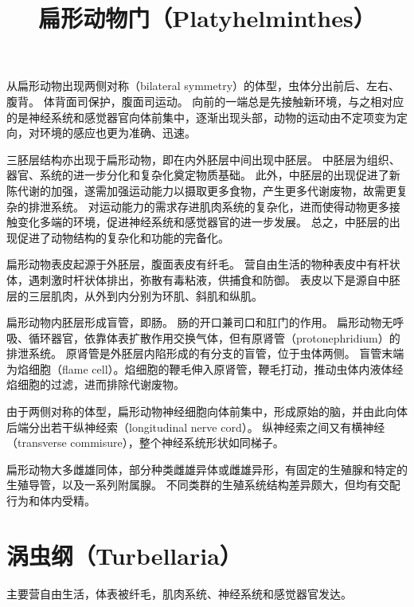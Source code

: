 \documentclass[11pt]{article}
\title{扁形动物门（Platyhelminthes）}
\date{}
\begin{document}
  \maketitle

  \linenumbers
从扁形动物出现两侧对称（bilateral symmetry）的体型，虫体分出前后、左右、腹背。
体背面司保护，腹面司运动。
向前的一端总是先接触新环境，与之相对应的是神经系统和感觉器官向体前集中，逐渐出现头部，动物的运动由不定项变为定向，对环境的感应也更为准确、迅速。

\newline

三胚层结构亦出现于扁形动物，即在内外胚层中间出现中胚层。
中胚层为组织、器官、系统的进一步分化和复杂化奠定物质基础。
此外，中胚层的出现促进了新陈代谢的加强，遂需加强运动能力以摄取更多食物，产生更多代谢废物，故需更复杂的排泄系统。
对运动能力的需求存进肌肉系统的复杂化，进而使得动物更多接触变化多端的环境，促进神经系统和感觉器官的进一步发展。
总之，中胚层的出现促进了动物结构的复杂化和功能的完备化。

\newline

扁形动物表皮起源于外胚层，腹面表皮有纤毛。
营自由生活的物种表皮中有杆状体，遇刺激时杆状体排出，弥散有毒粘液，供捕食和防御。
表皮以下是源自中胚层的三层肌肉，从外到内分别为环肌、斜肌和纵肌。

\newline

扁形动物内胚层形成盲管，即肠。
肠的开口兼司口和肛门的作用。
扁形动物无呼吸、循环器官，依靠体表扩散作用交换气体，但有原肾管（protonephridium）的排泄系统。
原肾管是外胚层内陷形成的有分支的盲管，位于虫体两侧。
盲管末端为焰细胞（flame cell）。焰细胞的鞭毛伸入原肾管，鞭毛打动，推动虫体内液体经焰细胞的过滤，进而排除代谢废物。

\newline

由于两侧对称的体型，扁形动物神经细胞向体前集中，形成原始的脑，并由此向体后端分出若干纵神经索（longitudinal nerve cord）。
纵神经索之间又有横神经（transverse commisure），整个神经系统形状如同梯子。

\newline

扁形动物大多雌雄同体，部分种类雌雄异体或雌雄异形，有固定的生殖腺和特定的生殖导管，以及一系列附属腺。
不同类群的生殖系统结构差异颇大，但均有交配行为和体内受精。

\section{涡虫纲（Turbellaria）}
主要营自由生活，体表被纤毛，肌肉系统、神经系统和感觉器官发达。
\end{document}
